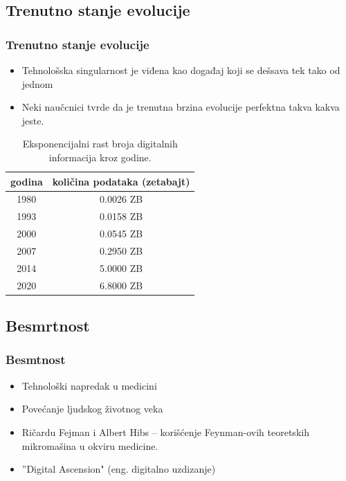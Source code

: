 \documentclass{beamer}
\begin{document}
\subsection{Trenutno stanje evolucije}
\begin{frame}[fragile]\frametitle{Trenutno stanje evolucije}
	\begin{itemize}	
		\item Tehnološska singularnost je viđena kao događaj koji se dešsava tek tako od
jednom
            \item Neki naučcnici tvrde da je trenutna brzina evolucije perfektna takva kakva
jeste.
	\end{itemize}
 
        \begin{table}[h!]
            \begin{center}
                \begin{tabular}{|c|c|} \hline
                    \textbf{godina}& \textbf{količina podataka (zetabajt)}\\ \hline
                        1980 &0.0026 ZB\\ \hline
                        1993 &0.0158 ZB\\ \hline
                        2000 &0.0545 ZB\\ \hline
                        2007 &0.2950 ZB\\ \hline
                        2014 &5.0000 ZB\\ \hline
                        2020 &6.8000 ZB\\ \hline
                \end{tabular}
            \caption{Eksponencijalni rast broja digitalnih informacija kroz godine.}
            \label{tab:tabela1}
            \end{center}
        \end{table}
\end{frame}
\subsection{Besmrtnost}
\begin{frame}[fragile]\frametitle{Besmtnost}
	\begin{itemize}	
        \item Tehnološki napredak u medicini
        \item Povećanje ljudskog životnog veka
        \item Ričardu Fejman i Albert Hibs – korišćenje Feynman-ovih teoretskih mikromašina u okviru medicine.
        \item ''Digital Ascension" (eng. digitalno uzdizanje)
	\end{itemize}
\end{frame}
\end{document}

